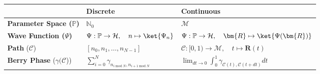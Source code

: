\documentclass{article}
\begin{document}
\begin{table}
\centering
\begin{tabular}{||l|l|l||}
\hline
&\textbf{Discrete} & \textbf{Continuous}\\
\hline
\textbf{Parameter Space ($\mathbb{P}$)} & $\mathbb{N}_{0}$ &  $\mathcal{M}$\\
\hline
\textbf{Wave Function ($\Psi$)} & $\Psi: \mathbb{P} \rightarrow \mathcal{H}, \quad n \mapsto \ket{\Psi_{n}}$ & $\Psi: \mathbb{P} \rightarrow \mathcal{H}, \quad \bm{R} \mapsto \ket{\Psi(\bm{R})}$ \\
\hline
\textbf{Path} ($\mathcal{C}$) &  $[n_{0}, n_{1}, \ldots, n_{N-1}]$ & $\mathcal{C}: [0, 1) \rightarrow \mathcal{M}, \quad t \mapsto \bm{R}(t)$\\
\hline
\textbf{Berry Phase} ($\gamma(\mathcal{C}$)) & $\sum_{i = 0}^{N} \gamma_{n_{i \; \mathrm{mod} \; N}, n_{i+1 \; \mathrm{mod} \; N}}$ & $\lim_{dt \to 0} \int_0^1 \gamma_{\mathcal{C}(t), \mathcal{C}(t + dt)} dt$\\
\hline
\end{tabular}
\end{table}
\end{document}
